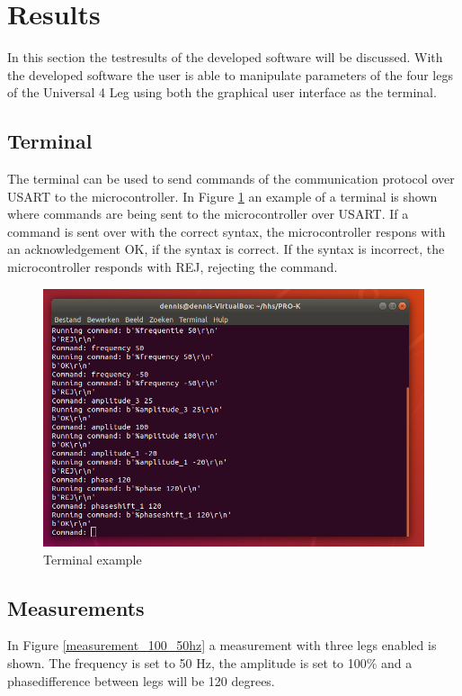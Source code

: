 \section{Results}

In this section the testresults of the developed software will be discussed. With the developed software the user is able to manipulate parameters of the four legs of the Universal 4 Leg using both the graphical user interface as the terminal.

\subsection{Terminal}
The terminal can be used to send commands of the communication protocol over USART to the microcontroller. In Figure \ref{terminal} an example of a terminal is shown where commands are being sent to the microcontroller over USART. If a command is sent over with the correct syntax, the microcontroller respons with an acknowledgement OK, if the syntax is correct. If the syntax is incorrect, the microcontroller responds with REJ, rejecting the command.

\begin{figure}[h!]
\centering
\includegraphics[width=\linewidth]{pictures/terminal.png}
\caption{Terminal example}
\label{terminal}
\end{figure}

\subsection{Measurements}
In Figure \ref{measurement_100_50hz} a measurement with three legs enabled is shown. The frequency is set to 50 Hz, the amplitude is set to 100\% and a phasedifference between legs will be 120 degrees. 

